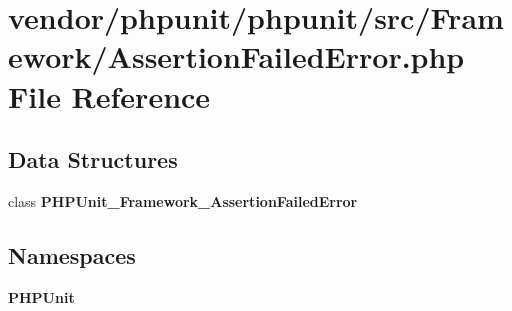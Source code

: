 \section{vendor/phpunit/phpunit/src/\+Framework/\+Assertion\+Failed\+Error.php File Reference}
\label{_assertion_failed_error_8php}
\subsection*{Data Structures}
\begin{DoxyCompactItemize}
\item 
class {\bf P\+H\+P\+Unit\+\_\+\+Framework\+\_\+\+Assertion\+Failed\+Error}
\end{DoxyCompactItemize}
\subsection*{Namespaces}
\begin{DoxyCompactItemize}
\item 
 {\bf P\+H\+P\+Unit}
\end{DoxyCompactItemize}
